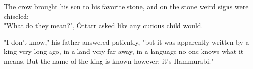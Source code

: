 The crow brought his son to his favorite stone, and on the stone weird signs were chiseled:\\


  
"What do they mean?", Óttarr asked like any curious child would.

"I don't know," his father answered patiently, "but it was apparently written by a king very long ago, in a land very far away, in a language no one knows what it means. But the name of the king is known however: it's Hammurabi." 

